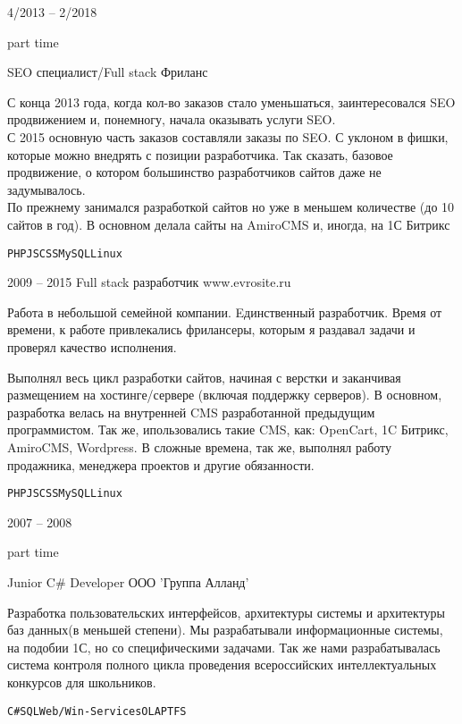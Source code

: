 \documentclass[10pt]{tpl/developercv} %
\begin{document}
\begin{entrylist}
	\entry
		{4/2013 -- 2/2018

		\footnotesize{part time}}
		{SEO специалист/Full stack}
		{Фриланс}
		{С конца 2013 года, когда кол-во заказов стало уменьшаться, заинтересовался SEO продвижением и, понемногу, начала оказывать услуги SEO.\\
		С 2015 основную часть заказов составляли заказы по SEO. С уклоном в фишки, которые можно внедрять с позиции разработчика. Так сказать, базовое продвижение, о котором большинство разработчиков сайтов даже не задумывалось.\\
		По прежнему занимался разработкой сайтов но уже в меньшем количестве (до 10 сайтов в год). В основном делала сайты на AmiroCMS и, иногда, на 1С Битрикс

		\texttt{PHP}\slashsep\texttt{JS}\slashsep\texttt{CSS}\slashsep\texttt{MySQL}\slashsep\texttt{Linux}}

  \entry
    {2009 -- 2015}
    {Full stack разработчик}
    {www.evrosite.ru}
    {Работа в небольшой семейной компании. Eдинственный разработчик. Время от времени, к работе привлекались фрилансеры, которым я раздавал задачи и проверял качество исполнения.

    Выполнял весь цикл разработки сайтов, начиная с верстки и заканчивая размещением на хостинге/сервере (включая поддержку серверов). В основном, разработка велась на внутренней CMS разработанной предыдущим программистом. Так же, ипользовались такие CMS, как: OpenCart, 1C Битрикс, AmiroCMS, Wordpress. В сложные времена, так же, выполнял работу продажника, менеджера проектов и другие обязанности.

    \texttt{PHP}\slashsep\texttt{JS}\slashsep\texttt{CSS}\slashsep\texttt{MySQL}\slashsep\texttt{Linux}}

	\entry
		{2007 -- 2008

		\footnotesize{part time}}
		{Junior C\# Developer}
		{ООО 'Группа Алланд'}
		{Разработка пользовательских интерфейсов, архитектуры системы и архитектуры баз данных(в меньшей степени). Мы разрабатывали информационные системы, на подобии 1С, но со специфическими задачами. Так же нами разрабатывалась система контроля полного цикла проведения всероссийских интеллектуальных конкурсов для школьников.

		\texttt{C\#}\slashsep\texttt{SQL}\slashsep\texttt{Web/Win-Services}\slashsep\texttt{OLAP}\slashsep\texttt{TFS}}

\end{entrylist}

\end{document}
